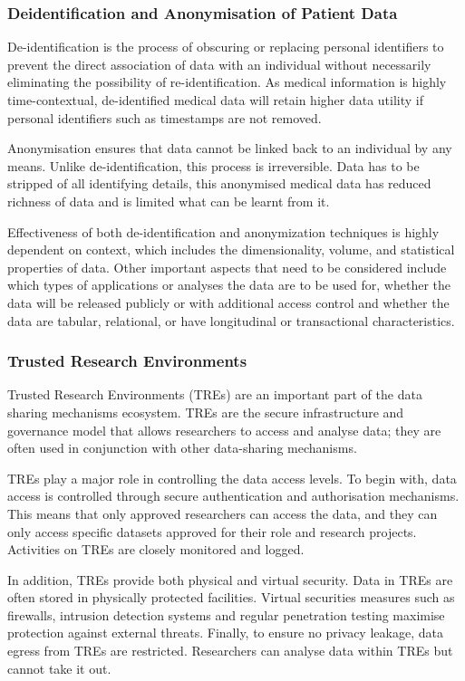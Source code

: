 \documentclass[11pt]{article}
\begin{document}
\subsubsection{Deidentification and Anonymisation of Patient Data}
De-identification is the process of obscuring or replacing personal identifiers to prevent the direct association of data with an individual without necessarily eliminating the possibility of re-identification. As medical information is highly time-contextual, de-identified medical data will retain higher data utility if personal identifiers such as timestamps are not removed.

Anonymisation ensures that data cannot be linked back to an individual by any means. Unlike de-identification, this process is irreversible. Data has to be stripped of all identifying details, this anonymised medical data has reduced richness of data and is limited what can be learnt from it. 

Effectiveness of both de-identification and anonymization techniques is highly dependent on context, which includes the dimensionality, volume, and statistical properties of data. Other important aspects that need to be considered include which types of applications or analyses the data are to be used for, whether the data will be released publicly or with additional access control and whether the data are tabular, relational, or have longitudinal or transactional characteristics.

\subsubsection{Trusted Research Environments}

Trusted Research Environments (TREs) are an important part of the data sharing mechanisms ecosystem. TREs are the secure infrastructure and governance model that allows researchers to access and analyse data; they are often used in conjunction with other data-sharing mechanisms.

TREs play a major role in controlling the data access levels. To begin with, data access is controlled through secure authentication and authorisation mechanisms. This means that only approved researchers can access the data, and they can only access specific datasets approved for their role and research projects. Activities on TREs are closely monitored and logged.

In addition, TREs provide both physical and virtual security. Data in TREs are often stored in physically protected facilities. Virtual securities measures such as firewalls, intrusion detection systems and regular penetration testing maximise protection against external threats.  Finally, to ensure no privacy leakage, data egress from TREs are restricted. Researchers can analyse data within TREs but cannot take it out.
\end{document}
